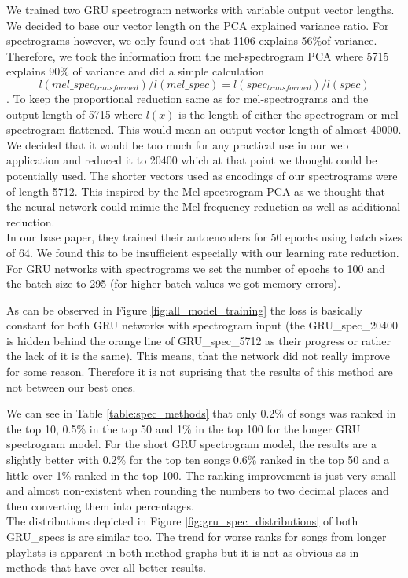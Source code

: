 We trained two GRU spectrogram networks with variable output vector lengths. We decided to base our vector length on the PCA explained variance ratio. For spectrograms however, we only found out that 1106 explains 56\%of variance. Therefore, we took the information from the mel-spectrogram PCA where 5715 explains 90\% of variance and did a simple calculation $$ l(mel\_spec_{transformed})/l(mel\_spec) = l(spec_{transformed})/l(spec) $$. To keep the proportional reduction same as for mel-spectrograms and the output length of 5715 where $l(x)$ is the length of either the spectrogram or mel-spectrogram flattened. This would mean an output vector length of almost 40000. We decided that it would be too much for any practical use in our web application and reduced it to 20400 which at that point we thought could be potentially used. The shorter vectors used as encodings of our spectrograms were of length 5712. This inspired by the Mel-spectrogram PCA as we thought that the neural network could mimic the Mel-frequency reduction as well as additional reduction. \\
In our base paper, they trained their autoencoders for 50 epochs using batch sizes of 64. We found this to be insufficient especially with our learning rate reduction. For GRU networks with spectrograms we set the number of epochs to 100 and the batch size to 295 (for higher batch values we got memory errors). 

As can be observed in Figure \ref{fig:all_model_training} the loss is basically constant for both GRU networks with spectrogram input (the GRU\_spec\_20400 is hidden behind the orange line of GRU\_spec\_5712 as their progress or rather the lack of it is the same). This means, that the network did not really improve for some reason. Therefore it is not suprising that the results of this method are not between our best ones.

We can see in Table \ref{table:spec_methods} that only 0.2\% of songs was ranked in the top 10, 0.5\% in the top 50 and 1\% in the top 100 for the longer GRU spectrogram model. For the short GRU spectrogram model, the results are a slightly better with 0.2\% for the top ten songs 0.6\% ranked in the top 50 and a little over 1\% ranked in the top 100. The ranking improvement is just very small and almost non-existent when rounding the numbers to two decimal places and then converting them into percentages. \\
The distributions depicted in Figure \ref{fig:gru_spec_distributions} of both GRU\_specs is are similar too. The trend for worse ranks for songs from longer playlists is apparent in both method graphs but it is not as obvious as in methods that have over all better results.

